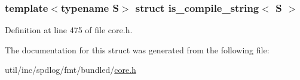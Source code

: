 \subsubsection*{template$<$typename S$>$\newline
struct is\+\_\+compile\+\_\+string$<$ S $>$}



Definition at line 475 of file core.\+h.



The documentation for this struct was generated from the following file\+:\begin{DoxyCompactItemize}
\item 
util/inc/spdlog/fmt/bundled/\hyperlink{core_8h}{core.\+h}\end{DoxyCompactItemize}
